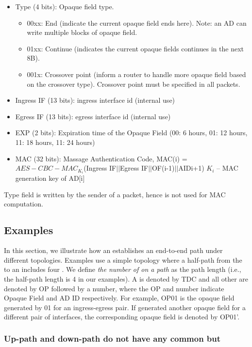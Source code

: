 \begin{itemize}
\begin{itemize}
	\item{Type (4 bits): } Opaque field type. 
		\begin{itemize}
		\item{00xx}: End (indicate the current opaque field ends here). Note: an AD can write multiple blocks of opaque field.
		\item{01xx}: Continue (indicates the current opaque fields continues in the next 8B).
		\item{001x}: Crossover point (inform a router to handle more opaque field based on the crossover type). Crossover point must be specified in all packets.
		\end{itemize}
	\item{Ingress IF (13 bits): } ingress interface id (internal use)
	\item{Egress IF (13 bits): } egress interface id (internal use)
	\item{EXP (2 bits): } Expiration time of the Opaque Field (00: 6 hours, 01: 12 hours, 11: 18 hours, 11: 24 hours)
	\item{MAC (32 bits): } Massage Authentication Code, MAC(i) = $AES-CBC-MAC_{K_i}$(Ingress IF$||$Egress IF$||$OF(i-1)$||$AIDi+1)\newline
		$K_i$ – MAC generation key of AD[i]
	\end{itemize}
Type field is written by the sender of a packet, hence is not used for MAC computation.
\end{itemize}

\subsection{Examples}
In this section, we illustrate how an \AD establishes an end-to-end path under different topologies. Examples use a simple topology where a half-path from the \ISDC to an \STUB \AD includes four \ADs. We define {\em the number of \ADs on a path} as the path length (i.e., the half-path length is 4 in our examples). A \ISDC \AD is denoted by TDC and all other \ADs are denoted by OP followed by a number, where the OP and number indicate Opaque Field and AD ID respectively. For example, OP01 is the opaque field generated by  01 for an ingress-egress pair. If  generated another opaque field for a different pair of interfaces, the corresponding opaque field is denoted by OP01'.

\subsubsection{Up-path and down-path do not have any common \AD but \ISDC}

